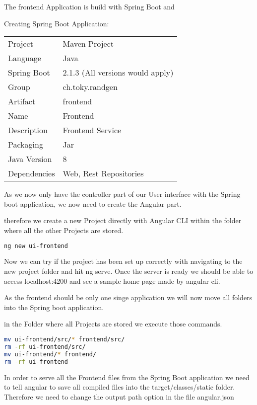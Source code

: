 The frontend Application is build with Spring Boot and 

Creating Spring Boot Application:
\begin{tabbing}
\begin{tabular}{ll}
Project & Maven Project \\
Language & Java \\
Spring Boot & 2.1.3 (All versions would apply) \\
Group & ch.toky.randgen \\
Artifact & frontend \\
Name & Frontend \\
Description & Frontend Service \\
Packaging & Jar \\
Java Version & 8 \\
Dependencies & Web, Rest Repositories
\end{tabular}
\end{tabbing}

As we now only have the controller part of our User interface with the Spring boot application, we now need to create the Angular part.

therefore we create a new Project directly with Angular CLI within the folder where all the other Projects are stored.

\begin{lstlisting}[language=Bash]
ng new ui-frontend
\end{lstlisting}

Now we can try if the project has been set up correctly with navigating to the new project folder and hit ng serve.
Once the server is ready we should be able to access localhost:4200 and see a sample home page made by angular cli.

As the frontend should be only one singe application we will now move all folders into the Spring boot application.

in the Folder where all Projects are stored we execute those commands.
\begin{lstlisting}[language=Bash]
mv ui-frontend/src/* frontend/src/
rm -rf ui-frontend/src/
mv ui-frontend/* frontend/
rm -rf ui-frontend
\end{lstlisting}

In order to serve all the Frontend files from the Spring Boot application we need to tell angular to save all compiled files into the target/classes/static folder.
Therefore we need to change the output path option in the file angular.json

